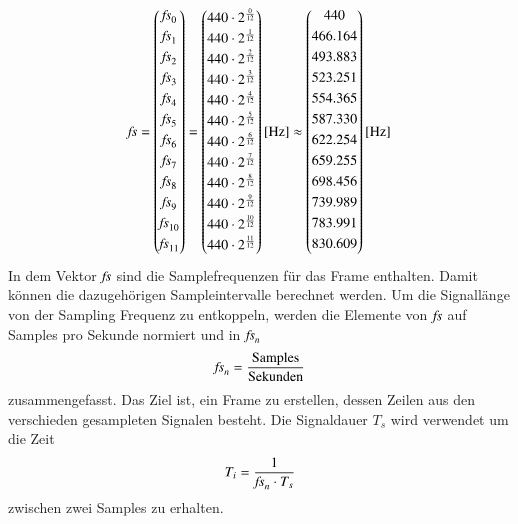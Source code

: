 \[
\fs
=
 \begin{pmatrix}
\fs_{0}\\[1mm]
\fs_{1}\\[1mm]
\fs_{2}\\[1mm]
\fs_{3}\\[1mm]
\fs_{4}\\[1mm]
\fs_{5}\\[1mm]
\fs_{6}\\[1mm]
\fs_{7}\\[1mm]
\fs_{8}\\[1mm]
\fs_{9}\\[1mm]
\fs_{10}\\[1mm]
\fs_{11}\\[1mm]
\end{pmatrix}
=
\begin{pmatrix}
440\cdot2^{\frac{0}{12}}\\[0.5mm]
440\cdot2^{\frac{1}{12}}\\[0.5mm]
440\cdot2^{\frac{2}{12}}\\[0.5mm]
440\cdot2^{\frac{3}{12}}\\[0.5mm]
440\cdot2^{\frac{4}{12}}\\[0.5mm]
440\cdot2^{\frac{5}{12}}\\[0.5mm]
440\cdot2^{\frac{6}{12}}\\[0.5mm]
440\cdot2^{\frac{7}{12}}\\[0.5mm]
440\cdot2^{\frac{8}{12}}\\[0.5mm]
440\cdot2^{\frac{9}{12}}\\[0.5mm]
440\cdot2^{\frac{10}{12}}\\[0.5mm]
440\cdot2^{\frac{11}{12}}\\[0.5mm]
\end{pmatrix}
 \text{[Hz]}
 \approx
 \begin{pmatrix}
 440\\[1mm]
466.164\\[1mm]
493.883\\[1mm]
523.251\\[1mm]
554.365\\[1mm]
587.330\\[1mm]
622.254\\[1mm]
659.255\\[1mm]
698.456\\[1mm]
739.989\\[1mm]
783.991\\[1mm]
830.609\\[1mm]
 \end{pmatrix}
 \text{[Hz]} 
\]
In dem Vektor $\fs$ sind die Samplefrequenzen für das Frame enthalten. Damit können die dazu\-ge\-hörigen Sampleintervalle berechnet werden. Um die  Signallänge von der Sampling Frequenz zu entkoppeln, werden die Elemente von $\fs$ auf Samples pro Sekunde normiert und in $\fs_{n}$  
\[\fs_{n} = \frac{\text{Samples}}{\text{Sekunden}}\]
zusammengefasst.
Das Ziel ist, ein Frame zu erstellen, dessen Zeilen aus den verschieden gesampleten Signalen besteht. Die Signaldauer $T_{s}$ wird verwendet um die Zeit
\[T_{i}=\frac{1}{\fs_{n}\cdot T_{s}}\]
zwischen zwei Samples zu erhalten.

